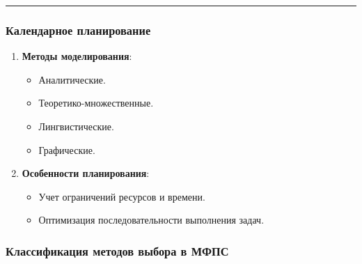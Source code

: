 \documentclass[
]{article}
\providecommand{\tightlist}{%
  \setlength{\itemsep}{0pt}\setlength{\parskip}{0pt}}
\begin{document}
\begin{center}\rule{0.5\linewidth}{0.5pt}\end{center}

\subsubsection{\texorpdfstring{\textbf{Календарное
планирование}}{Календарное планирование}}\label{ux43aux430ux43bux435ux43dux434ux430ux440ux43dux43eux435-ux43fux43bux430ux43dux438ux440ux43eux432ux430ux43dux438ux435}

\begin{enumerate}
\def\labelenumi{\arabic{enumi}.}
\item
  \textbf{Методы моделирования}:

  \begin{itemize}
  \tightlist
  \item
    Аналитические.
  \item
    Теоретико-множественные.
  \item
    Лингвистические.
  \item
    Графические.
  \end{itemize}
\item
  \textbf{Особенности планирования}:

  \begin{itemize}
  \tightlist
  \item
    Учет ограничений ресурсов и времени.
  \item
    Оптимизация последовательности выполнения задач.
  \end{itemize}
\end{enumerate}

\subsubsection{\texorpdfstring{\textbf{Классификация методов выбора в
МФПС}}{Классификация методов выбора в МФПС}}\label{ux43aux43bux430ux441ux441ux438ux444ux438ux43aux430ux446ux438ux44f-ux43cux435ux442ux43eux434ux43eux432-ux432ux44bux431ux43eux440ux430-ux432-ux43cux444ux43fux441}
\end{document}
